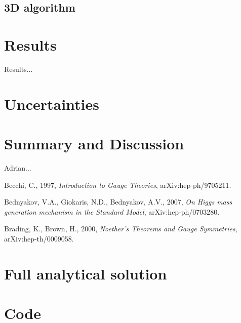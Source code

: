 \documentclass[aps,twocolumn,pre,nofootinbib]{revtex4-1}
\begin{document}
\subsection{3D algorithm}






\section{Results \label{sec:res}}


Results...


\section{Uncertainties \label{sec:unc}}




\section{Summary and Discussion \label{sec:sum}}


\begin{acknowledgments}
Adrian...
\end{acknowledgments}

\begin{thebibliography}{5}

 Becchi, C., 1997, \emph{Introduction to Gauge Theories}, arXiv:hep-ph/9705211.

 Bednyakov, V.A., Giokaris, N.D., Bednyakov, A.V., 2007, \emph{On Higgs mass generation mechanism in the Standard Model}, 	arXiv:hep-ph/0703280.

 Brading, K., Brown, H., 2000, \emph{Noether's Theorems and Gauge Symmetries}, arXiv:hep-th/0009058.



\end{thebibliography}



\appendix*
\section{Full analytical solution}
\section{Code}
\end{document}
